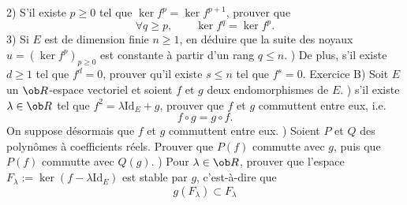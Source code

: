 2) S'il existe $p\ge0$ tel que $\ker f^p=\ker f^{p+1}$, prouver que 
$$
\forall q\ge p, \qquad \ker f^q=\ker f^p. 
$$
3) Si $E$ est de dimension finie $n\ge1$, en d\'eduire que la suite des noyaux $u=(\ker f^p)_{p\ge0}$ est constante \`a partir d'un rang $q\le n$. 
\bigskip{}) De plus, s'il existe $d\ge1$ tel que $f^d=0$, prouver qu'il existe $s\le n$ 
tel que $f^s=0$. 
\bigskip\bigskip
\noindent
{\twelvebf Exercice B)} Soit $E$ un $\ob R$-espace vectoriel et soient $f$ et $g$ deux endomorphismes de $E$. \medskip
{}) s'il existe $\lambda\in\ob R$ tel que 
$f^2=\lambda\mbox{Id}_E+g$, prouver que $f$ et $g$ commuttent entre eux, i.e. 
$$
f\circ g=g\circ f. 
$$
On suppose d\'esormais que $f$ et $g$ commuttent entre eux. \medskip\noindent
{}) Soient $P$ et $Q$ des polyn\^omes \`a coefficients r\'eels. Prouver que $P(f)$ commutte avec $g$, puis que $P(f)$ commutte avec $Q(g)$. 
\bigskip
{}) Pour $\lambda\in\ob R$, prouver que l'espace $F_\lambda:=\ker(f-\lambda\mbox{Id}_E)$ est stable par $g$, c'est-\`a-dire que 
$$
g(F_\lambda)\subset F_\lambda
$$




\bye



